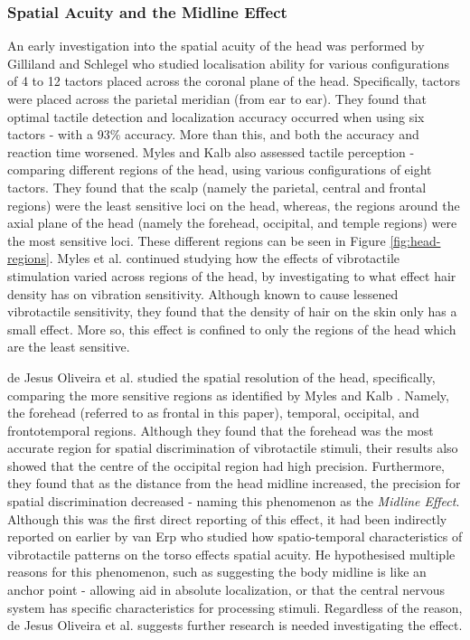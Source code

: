 \documentclass{interim}
\begin{document}
\subsubsection{Spatial Acuity and the Midline Effect}
An early investigation into the spatial acuity of the head was performed by Gilliland and Schlegel \cite{doi:10.1177/001872089403600410} who studied localisation ability for various configurations of 4 to 12 tactors placed across the coronal plane of the head. Specifically, tactors were placed across the parietal meridian (from ear to ear). They found that optimal tactile detection and localization accuracy occurred when using six tactors - with a 93\% accuracy. More than this, and both the accuracy and reaction time worsened. Myles and Kalb \cite{headguidelines} also assessed tactile perception - comparing different regions of the head, using various configurations of eight tactors. They found that the scalp (namely the parietal, central and frontal regions) were the least sensitive loci on the head, whereas, the regions around the axial plane of the head (namely the forehead, occipital, and temple regions) were the most sensitive loci. These different regions can be seen in Figure \ref{fig:head-regions}. Myles et al. \cite{MYLES2015177} continued studying how the effects of vibrotactile stimulation varied across regions of the head, by investigating to what effect hair density has on vibration sensitivity. Although known to cause lessened vibrotactile sensitivity, they found that the density of hair on the skin only has a small effect. More so, this effect is confined to only the regions of the head which are the least sensitive.

de Jesus Oliveira et al. \cite{7463147} studied the spatial resolution of the head, specifically, comparing the more sensitive regions as identified by Myles and Kalb \cite{headguidelines}. Namely, the forehead (referred to as frontal in this paper), temporal, occipital, and frontotemporal regions. Although they found that the forehead was the most accurate region for spatial discrimination of vibrotactile stimuli, their results also showed that the centre of the occipital region had high precision. Furthermore, they found that as the distance from the head midline increased, the precision for spatial discrimination decreased - naming this phenomenon as the \textit{Midline Effect}. Although this was the first direct reporting of this effect, it had been indirectly reported on earlier by van Erp \cite{1406917} who studied how spatio-temporal characteristics of vibrotactile patterns on the torso effects spatial acuity. He hypothesised multiple reasons for this phenomenon, such as suggesting the body midline is like an anchor point - allowing aid in absolute localization, or that the central nervous system has specific characteristics for processing stimuli. Regardless of the reason, de Jesus Oliveira et al. suggests further research is needed investigating the effect.
\end{document}
